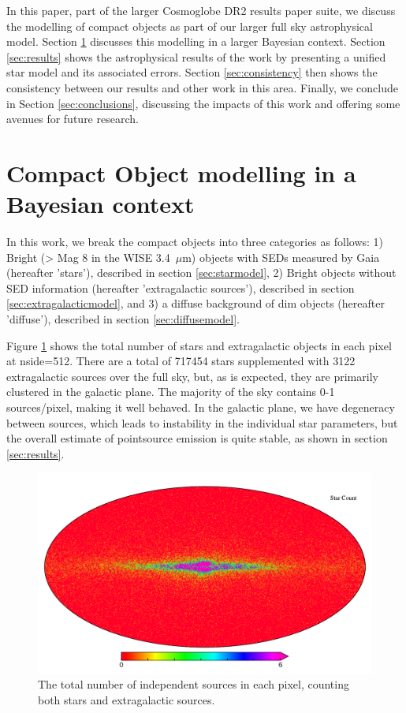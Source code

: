 \documentclass{aa}
\begin{document}
In this paper, part of the larger Cosmoglobe DR2 results paper suite, we discuss the modelling of compact objects as part of our larger full sky astrophysical model. Section \ref{sec:models} discusses this modelling in a larger Bayesian context. Section \ref{sec:results} shows the astrophysical results of the work by presenting a unified star model and its associated errors. Section \ref{sec:consistency} then shows the consistency between our results and other work in this area. Finally, we conclude in Section \ref{sec:conclusions}, discussing the impacts of this work and offering some avenues for future research.

\section{Compact Object modelling in a Bayesian context}
\label{sec:models}

In this work, we break the compact objects into three categories as follows: 1) Bright (> Mag 8 in the WISE 3.4 $\,\mu$m) objects with SEDs measured by Gaia (hereafter 'stars'), described in section \ref{sec:starmodel}, 2) Bright objects without SED information (hereafter 'extragalactic sources'), described in section \ref{sec:extragalacticmodel}, and 3) a diffuse background of dim objects (hereafter 'diffuse'), described in section \ref{sec:diffusemodel}.

Figure \ref{fig:starcount} shows the total number of stars and extragalactic objects in each pixel at nside=512. There are a total of 717454 stars supplemented with 3122 extragalactic sources over the full sky, but, as is expected, they are primarily clustered in the galactic plane. The majority of the sky contains 0-1 sources/pixel, making it well behaved. In the galactic plane, we have degeneracy between sources, which leads to instability in the individual star parameters, but the overall estimate of pointsource emission is quite stable, as shown in section \ref{sec:results}.

\begin{figure}
  \centering
  \includegraphics[width=\columnwidth]{figs/sourcecount/source_count.pdf}
  \caption{The total number of independent sources in each pixel, counting both stars and extragalactic sources. }
  \label{fig:starcount}
\end{figure}
\end{document}
